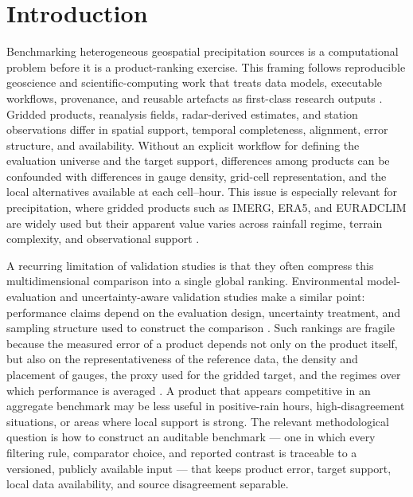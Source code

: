 \documentclass[preprint,12pt]{elsarticle}
\begin{document}
\section{Introduction}

Benchmarking heterogeneous geospatial precipitation sources is a computational problem before it is a product-ranking exercise. This framing follows reproducible geoscience and scientific-computing work that treats data models, executable workflows, provenance, and reusable artefacts as first-class research outputs \citep{pebesma2012rgeoscience,gil2016geosciencepaper,wilson2017goodenough,nuest2021practical}. Gridded products, reanalysis fields, radar-derived estimates, and station observations differ in spatial support, temporal completeness, alignment, error structure, and availability. Without an explicit workflow for defining the evaluation universe and the target support, differences among products can be confounded with differences in gauge density, grid-cell representation, and the local alternatives available at each cell--hour. This issue is especially relevant for precipitation, where gridded products such as IMERG, ERA5, and EURADCLIM are widely used but their apparent value varies across rainfall regime, terrain complexity, and observational support \citep{huffman2020imerg,hersbach2020era5,overeem2023euradclim,tapiador2012gpm,kidd2011status,maggioni2018review,derin2016complexterrain,yu2020highdensity}.

A recurring limitation of validation studies is that they often compress this multidimensional comparison into a single global ranking. Environmental model-evaluation and uncertainty-aware validation studies make a similar point: performance claims depend on the evaluation design, uncertainty treatment, and sampling structure used to construct the comparison \citep{jakeman2006tensteps,refsgaard2007uncertainty,bennett2013performance,roberts2017crossvalidation}. Such rankings are fragile because the measured error of a product depends not only on the product itself, but also on the representativeness of the reference data, the density and placement of gauges, the proxy used for the gridded target, and the regimes over which performance is averaged \citep{tessema2020representativeness,tian2018gaugedensity,tozer2012proxy}. A product that appears competitive in an aggregate benchmark may be less useful in positive-rain hours, high-disagreement situations, or areas where local support is strong. The relevant methodological question is how to construct an auditable benchmark --- one in which every filtering rule, comparator choice, and reported contrast is traceable to a versioned, publicly available input --- that keeps product error, target support, local data availability, and source disagreement separable.
\end{document}
